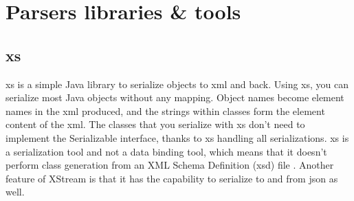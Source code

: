 \section{Parsers libraries \& tools}

\subsection{\gls{xs}}
\gls{xs} is a simple Java library to serialize objects to \gls{xml} and back. Using \gls{xs}, you can serialize most Java objects without any mapping. Object names become element names in the \gls{xml} produced, and the strings within classes form the element content of the \gls{xml}.
\newline
\newline
The classes that you serialize with \gls{xs} don't need to implement the Serializable interface, thanks to \gls{xs} handling all serializations. \gls{xs} is a serialization tool and not a data binding tool, which means that it doesn't perform class generation from an XML Schema Definition (\gls{xsd}) file \cite{bib:xstream} \cite{bib:ibm}.
\newline
\newline
Another feature of XStream is that it has the capability to serialize to and from \gls{json} as well.

